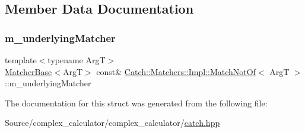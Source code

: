 \subsection{Member Data Documentation}
\mbox{\label{struct_catch_1_1_matchers_1_1_impl_1_1_match_not_of_af7ac67f112b0e93796b048a47329aad4}} 
\subsubsection{\texorpdfstring{m\+\_\+underlying\+Matcher}{m\_underlyingMatcher}}
{\footnotesize\ttfamily template$<$typename ArgT$>$ \\
\mbox{\hyperlink{struct_catch_1_1_matchers_1_1_impl_1_1_matcher_base}{Matcher\+Base}}$<$ArgT$>$ const\& \mbox{\hyperlink{struct_catch_1_1_matchers_1_1_impl_1_1_match_not_of}{Catch\+::\+Matchers\+::\+Impl\+::\+Match\+Not\+Of}}$<$ ArgT $>$\+::m\+\_\+underlying\+Matcher}



The documentation for this struct was generated from the following file\+:\begin{DoxyCompactItemize}
\item 
Source/complex\+\_\+calculator/complex\+\_\+calculator/\mbox{\hyperlink{catch_8hpp}{catch.\+hpp}}\end{DoxyCompactItemize}
